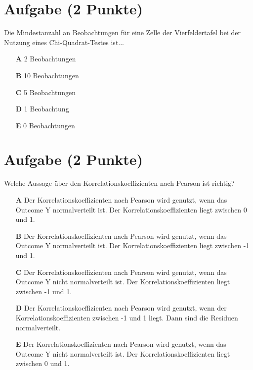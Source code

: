 \documentclass[a4paper, 10pt]{scrartcl}\usepackage[]{graphicx}\usepackage[]{xcolor}
\begin{document}
\section{Aufgabe \hfill (2 Punkte)}

Die Mindestanzahl an Beobachtungen f{\"u}r eine Zelle der Vierfeldertafel bei
der Nutzung eines Chi-Quadrat-Testes ist...



\begin{enumerate}
\item [\textbf{A} \msquare] 2 Beobachtungen
\item [\textbf{B} \msquare] 10 Beobachtungen
\item [\textbf{C} \msquare] 5 Beobachtungen
\item [\textbf{D} \msquare] 1 Beobachtung
\item [\textbf{E} \msquare] 0 Beobachtungen
\end{enumerate} 

\section{Aufgabe \hfill (2 Punkte)}




Welche Aussage {\"u}ber den Korrelationskoeffizienten nach Pearson
ist richtig?



\begin{enumerate}
\item [\textbf{A} \msquare] Der Korrelationskoeffizienten nach Pearson wird genutzt, wenn das Outcome Y normalverteilt ist. Der Korrelationskoeffizienten liegt zwischen 0 und 1.
\item [\textbf{B} \msquare] Der Korrelationskoeffizienten nach Pearson wird genutzt, wenn das Outcome Y normalverteilt ist. Der Korrelationskoeffizienten liegt zwischen -1 und 1.
\item [\textbf{C} \msquare] Der Korrelationskoeffizienten nach Pearson wird genutzt, wenn das Outcome Y nicht normalverteilt ist. Der Korrelationskoeffizienten liegt zwischen -1 und 1.
\item [\textbf{D} \msquare] Der Korrelationskoeffizienten nach Pearson wird genutzt, wenn der Korrelationskoeffizienten zwischen -1 und 1 liegt. Dann sind die Residuen normalverteilt.
\item [\textbf{E} \msquare] Der Korrelationskoeffizienten nach Pearson wird genutzt, wenn das Outcome Y nicht normalverteilt ist. Der Korrelationskoeffizienten liegt zwischen 0 und 1.
\end{enumerate} 
\end{document}
